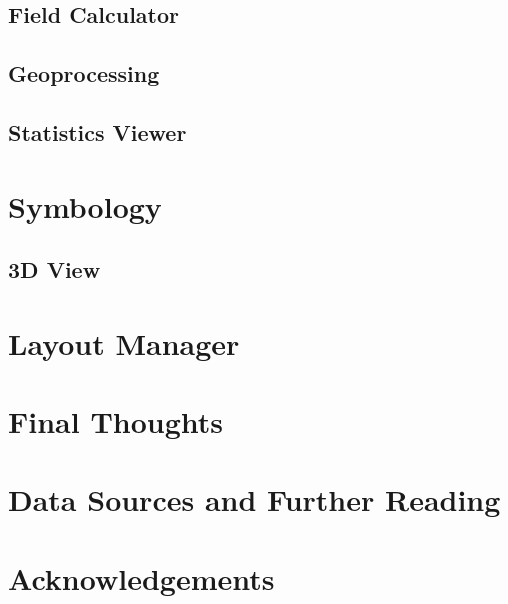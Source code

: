 \documentclass{article}
\begin{document}
\subsection{Field Calculator}

\subsection{Geoprocessing}

\subsection{Statistics Viewer}

\section{Symbology}

\subsection{3D View}

\section{Layout Manager}

\section{Final Thoughts}

\section{Data Sources and Further Reading}

\section{Acknowledgements}

\newpage
\printbibliography
\end{document}
